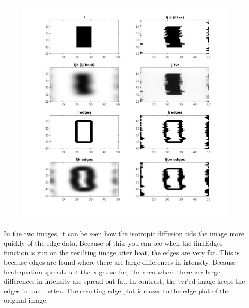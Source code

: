 \documentclass[12pt]{article}
\begin{document}
\begin{figure}[ht!]
\centering
\includegraphics[scale=0.5]{two}
\end{figure}

In the two images, it can be seen how the isotropic diffusion rids the image more quickly of the edge data. Because of this, you can see when the findEdges function is run on the resulting image after heat, the edges are very fat. This is because edges are found where there are large differences in intensity. Because heatequation spreads out the edges so far, the area where there are large differences in intensity are spread out fat. In contrast, the tvr'ed image keeps the edges in tact better. The resulting edge plot is closer to the edge plot of the original image.
\end{document}
